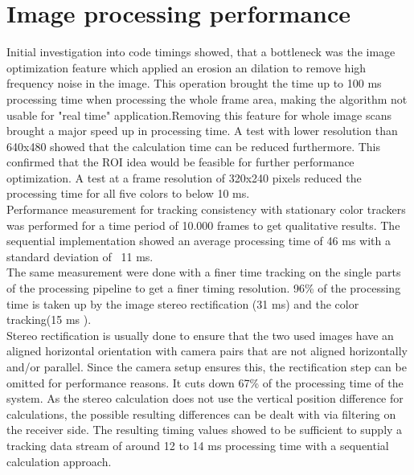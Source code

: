 \section{Image processing performance}
Initial investigation into code timings showed, that a bottleneck was the image optimization feature which applied an erosion an dilation to remove high frequency noise in the image. This operation brought the time up to 100 ms processing time when processing the whole frame area, making the algorithm  not usable for "real time" application.Removing this feature for whole image scans brought a major speed up in processing time. 
A test with lower resolution than 640x480 showed that the calculation time can be reduced furthermore. This confirmed that the ROI idea would be feasible for further performance optimization. A test at a frame resolution of 320x240 pixels reduced the processing time for all five colors to below 10 ms.\\
Performance measurement for tracking consistency with stationary color trackers was performed for a time period of 10.000 frames to get qualitative results. The sequential implementation showed an average processing time of 46 ms with a standard deviation of ~11 ms.\\
The same measurement were done with a finer time tracking on the single parts of the processing pipeline to get a finer timing resolution. 96\% of the processing time is taken up by the image stereo rectification (31 ms) and the color tracking(15 ms ).\\
Stereo rectification is usually done to ensure that the two used images have an aligned horizontal orientation with camera pairs that are not aligned horizontally and/or parallel. Since the camera setup ensures this, the rectification step can be omitted for performance reasons. It cuts down 67\% of the processing time of the system. As the stereo calculation does not use the vertical position difference for calculations, the possible resulting differences can be dealt with via filtering on the receiver side.
The resulting timing values showed to be sufficient to supply a tracking data stream of around 12 to 14 ms processing time with a sequential calculation approach.

